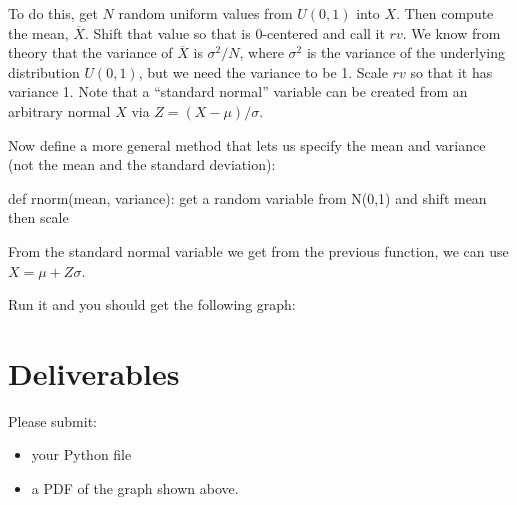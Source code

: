 \begin{fullwidth}
To do this, get $N$ random uniform values from $U(0,1)$ into $X$. Then compute the mean, $\overline X$. Shift that value so that is 0-centered and call it $rv$. We know from theory that the variance of $\overline X$ is $\sigma^2 / N$, where $\sigma^2$ is the variance of the underlying distribution $U(0,1)$, but we need the variance to be 1. Scale $rv$ so that it has variance 1. Note that a ``standard normal'' variable can be created from an arbitrary normal $X$ via $Z = (X-\mu)/\sigma$.

\step Now define a more general method that lets us specify the mean and variance (not the mean and the standard deviation):

\begin{pyverbatim}
def rnorm(mean, variance):
    get a random variable from N(0,1) and shift mean then scale
\end{pyverbatim}	

From the standard normal variable we get from the previous function, we can use $X = \mu+ Z\sigma$.

\step Run it and you should get the following graph:


\section{Deliverables}

Please submit:

\begin{itemize}
\item your Python file
\item a PDF of the graph shown above.
\end{itemize}

\end{fullwidth}


